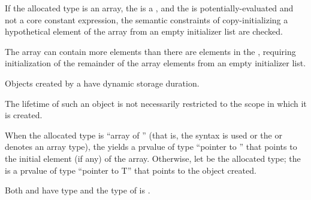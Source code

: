 \pnum
If the allocated type is an array,
the  is a , and
the 
is potentially-evaluated and not a core constant expression,
the semantic constraints of copy-initializing a hypothetical element of
the array from an empty initializer list
are checked.
\begin{note}
The array can contain more elements than there are
elements in the ,
requiring initialization of the remainder of the array elements from
an empty initializer list.
\end{note}

\pnum
{}%
Objects created by a  have dynamic storage
duration.
\begin{note}
%
The lifetime of such an object is not necessarily restricted to the
scope in which it is created.
\end{note}

\pnum
{}%
When the allocated type is ``array of  ''
(that is, the  syntax is used or the
 or  denotes an array type),
the  yields a prvalue of type ``pointer to ''
that points to the initial element (if any) of the array.
Otherwise, let  be the allocated type;
the 
is a prvalue of type ``pointer to T''
that points to the object created.
\begin{note}
Both  and  have type  and
the type of  is .
\end{note}

